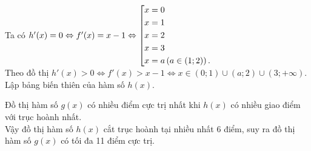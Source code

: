 \begin{ex}
{{\begin{tikzpicture}[scale=0.8, line join = round, line cap = round,>=stealth,thick]
			\end{tikzpicture}}
		Ta có $h'(x)=0 \Leftrightarrow f'(x)=x-1 \Leftrightarrow \hoac{&x=0\\&x=1\\&x=2\\&x=3\\&x=a\left(a\in (1;2)\right).}$ \\
		Theo đồ thị $h'(x)>0 \Leftrightarrow f'(x)>x-1 \Leftrightarrow x\in (0;1)\cup (a;2)\cup (3;+\infty)$. \\
		Lập bảng biến thiên của hàm số $h(x)$.
				\begin{center}
		\end{center}
		Đồ thị hàm số $g(x)$ có nhiều điểm cực trị nhất khi $h(x)$ có nhiều giao điểm với trục hoành nhất.\\
Vậy đồ thị hàm số $h(x)$ cắt trục hoành tại nhiều nhất $6$ điểm, suy ra đồ thị hàm số $g(x)$ có tối đa 11 điểm cực trị.}
\end{ex}
